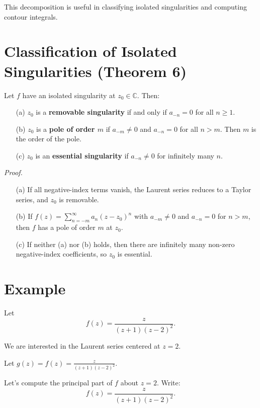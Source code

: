 \documentclass[12pt]{article}
\theoremstyle{definition} %
\theoremstyle{plain} %
\begin{document}
This decomposition is useful in classifying isolated singularities and computing contour integrals.
\section*{Classification of Isolated Singularities (Theorem 6)}

Let $f$ have an isolated singularity at $z_0 \in \mathbb{C}$. Then:

\begin{enumerate}
    \item[(a)] $z_0$ is a \textbf{removable singularity} if and only if $a_{-n} = 0$ for all $n \geq 1$.

    \item[(b)] $z_0$ is a \textbf{pole of order $m$} if $a_{-m} \neq 0$ and $a_{-n} = 0$ for all $n > m$. Then $m$ is the order of the pole.

    \item[(c)] $z_0$ is an \textbf{essential singularity} if $a_{-n} \neq 0$ for infinitely many $n$.
\end{enumerate}

\textit{Proof.}
\begin{itemize}
    \item[(a)] If all negative-index terms vanish, the Laurent series reduces to a Taylor series, and $z_0$ is removable.

    \item[(b)] If $f(z) = \sum_{n=-m}^{\infty} a_n (z - z_0)^n$ with $a_{-m} \neq 0$ and $a_{-n} = 0$ for $n > m$, then $f$ has a pole of order $m$ at $z_0$.

    \item[(c)] If neither (a) nor (b) holds, then there are infinitely many non-zero negative-index coefficients, so $z_0$ is essential.
\end{itemize}

\section*{Example}

Let
\[
f(z) = \frac{z}{(z + 1)(z - 2)^2}.
\]

We are interested in the Laurent series centered at $z = 2$.

Let $g(z) = f(z) = \frac{z}{(z + 1)(z - 2)^2}$.

Let’s compute the principal part of $f$ about $z = 2$. Write:
\[
f(z) = \frac{z}{(z + 1)(z - 2)^2}.
\]
\end{document}
